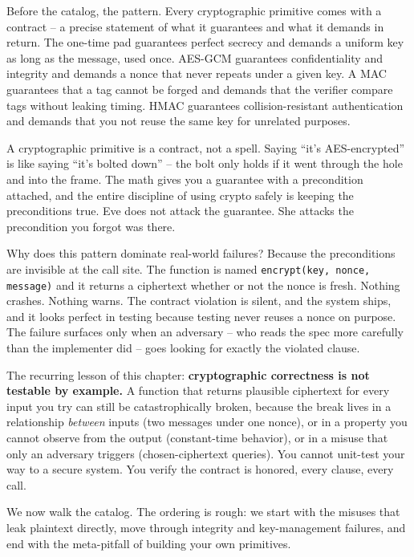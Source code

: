 Before the catalog, the pattern. Every cryptographic primitive comes with a contract -- a precise statement of what it guarantees and what it demands in return. The one-time pad guarantees perfect secrecy and demands a uniform key as long as the message, used once. AES-GCM guarantees confidentiality and integrity and demands a nonce that never repeats under a given key. A MAC guarantees that a tag cannot be forged and demands that the verifier compare tags without leaking timing. HMAC guarantees collision-resistant authentication and demands that you not reuse the same key for unrelated purposes.

\begin{intuitionbox}
A cryptographic primitive is a contract, not a spell. Saying ``it's AES-encrypted'' is like saying ``it's bolted down'' -- the bolt only holds if it went through the hole and into the frame. The math gives you a guarantee with a precondition attached, and the entire discipline of using crypto safely is keeping the preconditions true. Eve does not attack the guarantee. She attacks the precondition you forgot was there.
\end{intuitionbox}

Why does this pattern dominate real-world failures? Because the preconditions are invisible at the call site. The function is named \texttt{encrypt(key, nonce, message)} and it returns a ciphertext whether or not the nonce is fresh. Nothing crashes. Nothing warns. The contract violation is silent, and the system ships, and it looks perfect in testing because testing never reuses a nonce on purpose. The failure surfaces only when an adversary -- who reads the spec more carefully than the implementer did -- goes looking for exactly the violated clause.

\begin{focusbox}
The recurring lesson of this chapter: \textbf{cryptographic correctness is not testable by example.} A function that returns plausible ciphertext for every input you try can still be catastrophically broken, because the break lives in a relationship \emph{between} inputs (two messages under one nonce), or in a property you cannot observe from the output (constant-time behavior), or in a misuse that only an adversary triggers (chosen-ciphertext queries). You cannot unit-test your way to a secure system. You verify the contract is honored, every clause, every call.
\end{focusbox}

We now walk the catalog. The ordering is rough: we start with the misuses that leak plaintext directly, move through integrity and key-management failures, and end with the meta-pitfall of building your own primitives.

